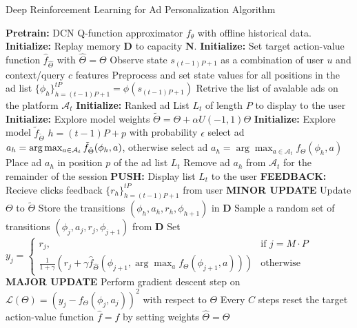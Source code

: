 \documentclass{mldsmsc}
\begin{document}
\begin{algorithm}
    \caption{Deep Reinforcement Learning for Ad Personalization Algorithm}
    \label{alg:drl-ap}
    \begin{algorithmic}[1]
        \State \textbf{Pretrain:} DCN Q-function approximator $f_{\theta}$ with offline historical data.
        \State \textbf{Initialize:} Replay memory $\mathbf{D}$ to capacity $\mathbf{N}$.
        \State \textbf{Initialize:} Set target action-value function $\hat{f}_{\hat{\Theta}}$ with $\hat{\Theta} = \Theta$
            \State Observe state $s_{(t-1)P+1}$ as a combination of user $u$ and context/query $c$ features
            \State Preprocess and set state values for all positions in the ad list $\{\phi_h\}_{h=(t-1)P+1}^{tP} = \phi(s_{(t-1)P+1})$
            \State Retrive the list of avalable ads on the platform $\mathcal{A}_t$
            \State \textbf{Initialize:} Ranked ad List $L_t$ of length $P$ to display to the user
            \State \textbf{Initialize:} Explore model weights $\tilde{\Theta} = \Theta + \alpha U(-1,1) \Theta$
            \State \textbf{Initialize:} Explore model $\tilde{f}_{\tilde{\Theta}}$
                    \State $h = (t-1)P + p$
                    \State with probability $\epsilon$ select ad $a_h = \arg\max_{a \in \mathcal{A}_t} \Tilde{f}_{\tilde{\Theta}}(\phi_h, a)$,
                    otherwise select ad $a_h = \arg\max_{a \in \mathcal{A}_t} f_{\Theta}(\phi_h, a)$
                    \State Place ad $a_h$ in position $p$ of the ad list $L_t$
                    \State Remove ad $a_h$ from $\mathcal{A}_t$ for the remainder of the session
                \EndFor
            \State \textbf{PUSH:} Display list $L_t$ to the user
            \State \textbf{FEEDBACK:} Recieve clicks feedback $\{r_h\}_{h=(t-1)P+1}^{tP}$ from user
                \State \textbf{MINOR UPDATE} Update $\Theta$ to $\tilde{\Theta}$
            \EndIf
            \State Store the transitions $(\phi_{h}, a_h, r_h, \phi_{h+1})$ in $\mathbf{D}$
            \EndFor
            \State Sample a random set of transitions $(\phi_{j}, a_j, r_j, \phi_{j+1})$ from $\mathbf{D}$
            \State Set $y_j = \begin{cases} r_j, & \text{if } j=M \cdot P\\ \frac{1}{1+\gamma}\left(r_j + \gamma \hat{f}_{\hat{\Theta}}(\phi_{j+1},\arg \max_{a}f_{\Theta}(\phi_{j+1},a))\right) & \text{otherwise} \end{cases}$
            \State \textbf{MAJOR UPDATE} Perform gradient descent step on $\mathcal{L}(\Theta) = \left(y_j - f_{\Theta}(\phi_j,a_j)\right)^2$ with respect to $\Theta$
            \State Every $C$ steps reset the target action-value function $\hat{f} = f$ by setting weights $\hat{\Theta} = \Theta$
        \EndFor
    \end{algorithmic}
\end{algorithm}
\end{document}
